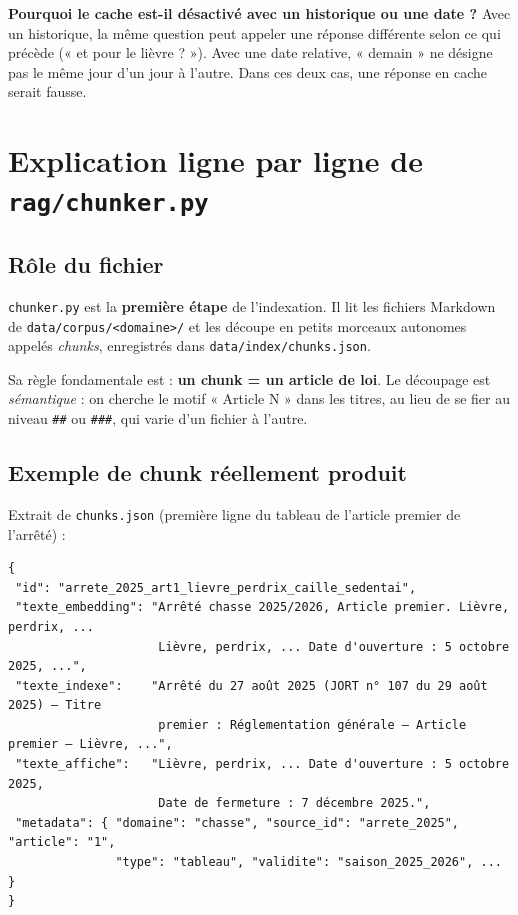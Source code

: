 \documentclass[11pt,a4paper]{article}
\newcommand{\fichier}[1]{\texttt{#1}}
\begin{document}
\textbf{Pourquoi le cache est-il désactivé avec un historique ou une date ?} Avec un
historique, la même question peut appeler une réponse différente selon ce qui précède
(« et pour le lièvre ? »). Avec une date relative, « demain » ne désigne pas le même jour
d'un jour à l'autre. Dans ces deux cas, une réponse en cache serait fausse.

\newpage
\section{Explication ligne par ligne de \texorpdfstring{\texttt{rag/chunker.py}}{rag/chunker.py}}

\subsection*{Rôle du fichier}

\fichier{chunker.py} est la \textbf{première étape} de l'indexation. Il lit les fichiers
Markdown de \fichier{data/corpus/<domaine>/} et les découpe en petits morceaux autonomes
appelés \emph{chunks}, enregistrés dans \fichier{data/index/chunks.json}.

Sa règle fondamentale est : \textbf{un chunk = un article de loi}. Le découpage est
\emph{sémantique} : on cherche le motif « Article N » dans les titres, au lieu de se fier au
niveau \texttt{\#\#} ou \texttt{\#\#\#}, qui varie d'un fichier à l'autre.

\subsection*{Exemple de chunk réellement produit}

Extrait de \fichier{chunks.json} (première ligne du tableau de l'article premier de l'arrêté) :

\begin{shaded}
\begin{Verbatim}[fontsize=\footnotesize]
{
 "id": "arrete_2025_art1_lievre_perdrix_caille_sedentai",
 "texte_embedding": "Arrêté chasse 2025/2026, Article premier. Lièvre, perdrix, ...
                     Lièvre, perdrix, ... Date d'ouverture : 5 octobre 2025, ...",
 "texte_indexe":    "Arrêté du 27 août 2025 (JORT n° 107 du 29 août 2025) — Titre
                     premier : Réglementation générale — Article premier — Lièvre, ...",
 "texte_affiche":   "Lièvre, perdrix, ... Date d'ouverture : 5 octobre 2025,
                     Date de fermeture : 7 décembre 2025.",
 "metadata": { "domaine": "chasse", "source_id": "arrete_2025", "article": "1",
               "type": "tableau", "validite": "saison_2025_2026", ... }
}
\end{Verbatim}
\end{shaded}
\end{document}
